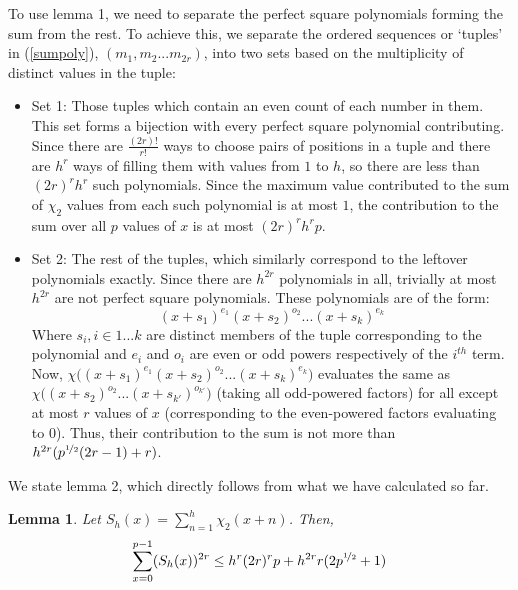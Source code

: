 \documentclass{report}
\newtheorem{lemma}{Lemma}
\begin{document}
To use lemma 1, we need to separate the perfect square polynomials forming the sum from the rest. To achieve this, we separate the ordered sequences or `tuples' in (\ref{sumpoly}), $(m_1, m_2...m_{2r})$, into two sets based on the multiplicity of distinct values in the tuple:
\begin{itemize}
  \item Set 1: Those tuples which contain an even count of each number in them. This set forms a bijection with every perfect square polynomial contributing. Since there are $\frac{(2r)!}{r!}$ ways to choose pairs of positions in a tuple and there are $h^{r}$ ways of filling them with values from $1$ to $h$, so there are less than $(2r)^r h^{r}$ such polynomials. Since the maximum value contributed to the sum of $\chi_2$ values from each such polynomial is at most $1$, the contribution to the sum over all $p$ values of $x$ is at most $(2r)^r h^{r}p$.
  \item Set 2: The rest of the tuples, which similarly correspond to the leftover polynomials exactly. Since there are $h^{2r}$ polynomials in all, trivially at most $h^{2r}$ are not perfect square polynomials. These polynomials are of the form:
  $$(x+s_1)^{e_1}(x+s_2)^{o_2}...(x+s_k)^{e_k}$$
  Where $s_i, i\in 1...k$ are distinct members of the tuple corresponding to the polynomial and $e_i$ and $o_i$ are even or odd powers respectively of the $i^{th}$ term. Now, $\chi\big((x+s_1)^{e_1}(x+s_2)^{o_2}...(x+s_k)^{e_k}\big)$ evaluates the same as $\chi\big((x+s_2)^{o_2}...(x+s_{k'})^{o_{k'}}\big)$ (taking all odd-powered factors) for all except at most $r$ values of $x$ (corresponding to the even-powered factors evaluating to $0$). Thus, their contribution to the sum is not more than $h^{2r}(p^{\nicefrac{1}{2}}(2r-1)+r)$.
\end{itemize}
%
We state lemma 2, which directly follows from what we have calculated so far.
%
\begin{lemma} \label{lemma2statement}
Let $S_h(x)=\sum\limits_{n=1}^{h}\chi_2(x+n)$. Then,
\begin{equation} \label{lemma2}
\sum\limits_{x=0}^{p-1}(S_h(x))^{2r}\leq h^{r}(2r)^{r}p+h^{2r}r(2p^{\nicefrac{1}{2}}+1)
\end{equation}
\end{lemma}
\end{document}
